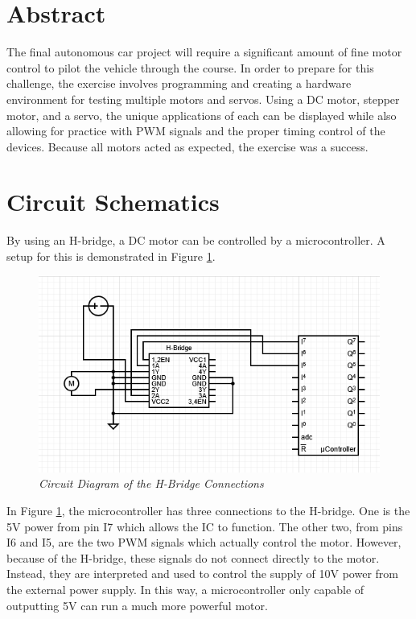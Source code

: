 \documentclass[CMPE]{KGCOEReport}
\begin{document}
\maketitle

\section*{Abstract}
The final autonomous car project will require a significant amount of fine
motor control to pilot the vehicle through the course. In order to prepare for
this challenge, the exercise involves programming and creating a hardware
environment for testing multiple motors and servos. Using a DC motor, stepper
motor, and a servo, the unique applications of each can be displayed while
also allowing for practice with PWM signals and the proper timing control of
the devices. Because all motors acted as expected, the exercise was a success. 

\section*{Circuit Schematics}
By using an H-bridge, a DC motor can be controlled by a microcontroller. A 
setup for this is demonstrated in Figure \ref{fig:hbridge}.
\begin{figure}[H]
    \centering
    \includegraphics[width=1\textwidth]{Images/hbridge_diagram.png} %
    \caption{\textit{Circuit Diagram of the H-Bridge Connections}}
    \label{fig:hbridge}
\end{figure}
In Figure \ref{fig:hbridge}, the microcontroller has three connections to the 
H-bridge. One is the 5V power from pin I7 which allows the IC to function. The
 other two, from pins I6 and I5, are the two PWM signals which actually 
 control the motor. However, because of the H-bridge, these signals do not 
 connect directly to the motor. Instead, they are interpreted and used to 
 control the supply of 10V power from the external power supply. In this way, 
 a microcontroller only capable of outputting 5V can run a much more powerful 
 motor. \\ \newpage
\end{document}
